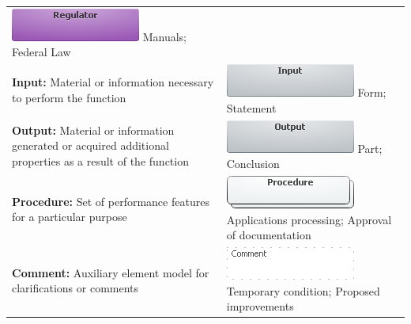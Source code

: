 \documentclass[]{book}
\begin{document}
\begin{longtable}[]{@{}ll@{}}
\begin{minipage}[t]{0.48\columnwidth}
\includegraphics{images/regulate.png} \newline  Manuals; Federal Law\strut
\end{minipage}\tabularnewline
\begin{minipage}[t]{0.46\columnwidth}\raggedright
\textbf{Input:} Material or information necessary to perform the function\strut
\end{minipage} & \begin{minipage}[t]{0.48\columnwidth}\raggedright
\includegraphics{images/input.png} \newline Form; Statement\strut
\end{minipage}\tabularnewline
\begin{minipage}[t]{0.46\columnwidth}\raggedright
\textbf{Output:} Material or information generated or acquired additional properties as a result of the function\strut
\end{minipage} & \begin{minipage}[t]{0.48\columnwidth}\raggedright
\includegraphics{images/output.png} \newline  Part; Conclusion\strut
\end{minipage}\tabularnewline
\begin{minipage}[t]{0.46\columnwidth}\raggedright
\textbf{Procedure:} Set of performance features for a particular purpose\strut
\end{minipage} & \begin{minipage}[t]{0.48\columnwidth}\raggedright
\includegraphics{images/procedure.png} \newline Applications processing; Approval of documentation\strut
\end{minipage}\tabularnewline
\begin{minipage}[t]{0.46\columnwidth}\raggedright
\textbf{Comment:} Auxiliary element model for clarifications or comments\strut
\end{minipage} & \begin{minipage}[t]{0.48\columnwidth}\raggedright
\includegraphics{images/comment.png} \newline     Temporary condition; Proposed improvements\strut
\end{minipage}\tabularnewline
\bottomrule
\end{longtable}
\end{document}

